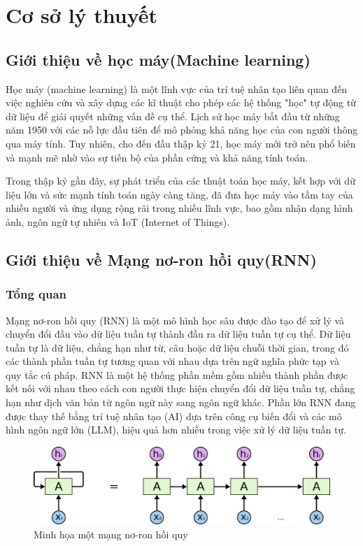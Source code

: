 \section{Cơ sở lý thuyết}
\subsection{Giới thiệu về học máy(Machine learning)}
\indent Học máy (machine learning) là một lĩnh vực của trí tuệ nhân tạo liên quan đến việc nghiên cứu và xây dựng các kĩ thuật cho phép các hệ thống "học" tự động từ dữ liệu để giải quyết những vấn đề cụ thể. Lịch sử học máy bắt đầu từ những năm 1950 với các nỗ lực đầu tiên để mô phỏng khả năng học của con người thông qua máy tính. Tuy nhiên, cho đến đầu thập kỷ 21, học máy mới trở nên phổ biến và mạnh mẽ nhờ vào sự tiến bộ của phần cứng và khả năng tính toán.

\indent Trong thập kỷ gần đây, sự phát triển của các thuật toán học máy, kết hợp với dữ liệu lớn và sức mạnh tính toán ngày càng tăng, đã đưa học máy vào tầm tay của nhiều người và ứng dụng rộng rãi trong nhiều lĩnh vực, bao gồm nhận dạng hình ảnh, ngôn ngữ tự nhiên và IoT (Internet of Things).

\subsection{Giới thiệu về Mạng nơ-ron hồi quy(RNN)}
\subsubsection{Tổng quan}
\indent Mạng nơ-ron hồi quy (RNN) là một mô hình học sâu được đào tạo để xử lý và chuyển đổi đầu vào dữ liệu tuần tự thành đầu ra dữ liệu tuần tự cụ thể. Dữ liệu tuần tự là dữ liệu, chẳng hạn như từ, câu hoặc dữ liệu chuỗi thời gian, trong đó các thành phần tuần tự tương quan với nhau dựa trên ngữ nghĩa phức tạp và quy tắc cú pháp. RNN là một hệ thống phần mềm gồm nhiều thành phần được kết nối với nhau theo cách con người thực hiện chuyển đổi dữ liệu tuần tự, chẳng hạn như dịch văn bản từ ngôn ngữ này sang ngôn ngữ khác. Phần lớn RNN đang được thay thế bằng trí tuệ nhân tạo (AI) dựa trên công cụ biến đổi và các mô hình ngôn ngữ lớn (LLM), hiệu quả hơn nhiều trong việc xử lý dữ liệu tuần tự.
\begin{figure}[H]
    \centering
    \includegraphics[width=\textwidth,height=\textheight,keepaspectratio]{Images/Theoretical basis/RNN-unrolled.png}
    \caption{Minh họa một mạng nơ-ron hồi quy}
    \label{fig:enter-label}
\end{figure}

